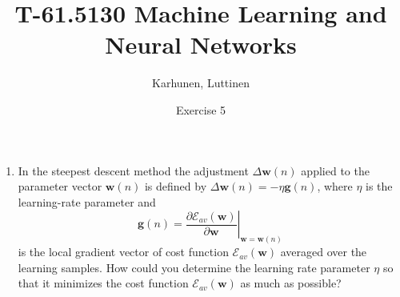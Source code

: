 
\title{T-61.5130 Machine Learning and Neural Networks}
\author{Karhunen, Luttinen}
\date{Exercise 5}

\usepackage{url}

\newcommand{\vect}[1]{{\bf{#1}}}
\newcommand{\svect}[1]{\boldsymbol{#1}}
\newcommand{\matr}[1]{\boldsymbol{#1}}




\maketitle
\thispagestyle{empty}

\begin{enumerate}
  
\item In the steepest descent method the adjustment
  $\Delta\mathbf{w}(n)$ applied to the parameter vector
  $\mathbf{w}(n)$ is defined by
  $\Delta\mathbf{w}(n)=-\eta\mathbf{g}(n)$, where $\eta$ is the
  learning-rate parameter and
  \begin{equation*}
    \mathbf{g}(n)=\left.\frac{\partial
        \mathcal{E}_{av}(\mathbf{w})}{\partial \mathbf{w}}\right|_{\mathbf{w}=\mathbf{w}(n)}
  \end{equation*}
  is the local gradient vector of cost
  function $\mathcal{E}_{av}(\mathbf{w})$ averaged over the learning
  samples. How could you determine the learning rate parameter $\eta$ so
  that it minimizes the cost function $\mathcal{E}_{av}(\mathbf{w})$ as much as possible?

  \begin{solution}



\end{solution}
\end{enumerate}

